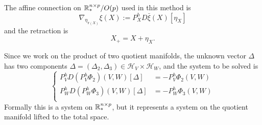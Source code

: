 The affine connection on $\mathbb{R}^{n \times p}_{*} / O(p)$ used in this method is 
\begin{equation}
    \nabla_{\eta_{\pi(X)}} \xi (X) := P^h_X D \bar{\xi}(X)[\eta_X]
\end{equation}
and the retraction is
\begin{equation}
    X_{+} = X + \eta_X.
\end{equation}

Since we work on the product of two quotient manifolds,
the unknown vector $\Delta$ has two components 
$\Delta = (\Delta_2, \Delta_3) \in \mathcal{H}_V \times \mathcal{H}_W$, and
the system to be solved is
\begin{equation}
\label{dg_newt_system}
\left\{
\begin{aligned}
    P^h_V D (P^h_V \Phi_2)(V, W)[\Delta] & = - P^h_V \Phi_2(V, W) \\
    P^h_W D (P^h_W \Phi_3)(V, W)[\Delta] & = - P^h_W \Phi_3(V, W) \\
\end{aligned}
\right.
\end{equation}
Formally this is a system on $\mathbb{R}^{n \times p}_{*}$, but it represents
a system on the quotient manifold lifted to the total space.


